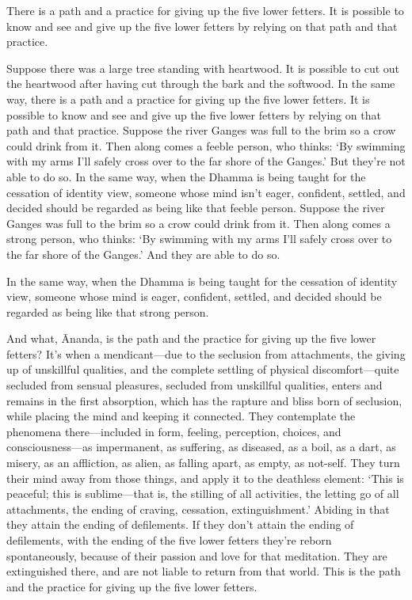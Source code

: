\documentclass[12pt,openany]{book}%
\begin{document}
There is a path and a practice for giving up the five lower fetters. It is possible to know and see and give up the five lower fetters by relying on that path and that practice. 

Suppose there was a large tree standing with heartwood. It is possible to cut out the heartwood after having cut through the bark and the softwood. In the same way, there is a path and a practice for giving up the five lower fetters. It is possible to know and see and give up the five lower fetters by relying on that path and that practice. Suppose the river Ganges was full to the brim so a crow could drink from it. Then along comes a feeble person, who thinks: ‘By swimming with my arms I’ll safely cross over to the far shore of the Ganges.’ But they’re not able to do so. In the same way, when the Dhamma is being taught for the cessation of identity view, someone whose mind isn’t eager, confident, settled, and decided should be regarded as being like that feeble person. Suppose the river Ganges was full to the brim so a crow could drink from it. Then along comes a strong person, who thinks: ‘By swimming with my arms I’ll safely cross over to the far shore of the Ganges.’ And they are able to do so. 

In the same way, when the Dhamma is being taught for the cessation of identity view, someone whose mind is eager, confident, settled, and decided should be regarded as being like that strong person. 

And what, Ānanda, is the path and the practice for giving up the five lower fetters? It’s when a mendicant—due to the seclusion from attachments, the giving up of unskillful qualities, and the complete settling of physical discomfort—quite secluded from sensual pleasures, secluded from unskillful qualities, enters and remains in the first absorption, which has the rapture and bliss born of seclusion, while placing the mind and keeping it connected. They contemplate the phenomena there—included in form, feeling, perception, choices, and consciousness—as impermanent, as suffering, as diseased, as a boil, as a dart, as misery, as an affliction, as alien, as falling apart, as empty, as not-self. They turn their mind away from those things, and apply it to the deathless element: ‘This is peaceful; this is sublime—that is, the stilling of all activities, the letting go of all attachments, the ending of craving, cessation, extinguishment.’ Abiding in that they attain the ending of defilements. If they don’t attain the ending of defilements, with the ending of the five lower fetters they’re reborn spontaneously, because of their passion and love for that meditation. They are extinguished there, and are not liable to return from that world. This is the path and the practice for giving up the five lower fetters. 
\end{document}
